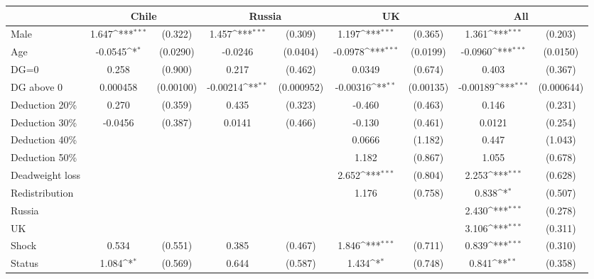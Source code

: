 {
\def\sym#1{\ifmmode^{#1}\else\(^{#1}\)\fi}
\begin{tabular}{l*{4}{cc}}
\hline\hline
                &\multicolumn{2}{c}{Chile}   &\multicolumn{2}{c}{Russia}  &\multicolumn{2}{c}{UK}      &\multicolumn{2}{c}{All}     \\
\hline
Male            &    1.647\sym{***}&  (0.322)&    1.457\sym{***}&  (0.309)&    1.197\sym{***}&  (0.365)&    1.361\sym{***}&  (0.203)\\
Age             &  -0.0545\sym{*}  & (0.0290)&  -0.0246         & (0.0404)&  -0.0978\sym{***}& (0.0199)&  -0.0960\sym{***}& (0.0150)\\
DG=0            &    0.258         &  (0.900)&    0.217         &  (0.462)&   0.0349         &  (0.674)&    0.403         &  (0.367)\\
DG above 0      & 0.000458         &(0.00100)& -0.00214\sym{**} &(0.000952)& -0.00316\sym{**} &(0.00135)& -0.00189\sym{***}&(0.000644)\\
Deduction 20\%  &    0.270         &  (0.359)&    0.435         &  (0.323)&   -0.460         &  (0.463)&    0.146         &  (0.231)\\
Deduction 30\%  &  -0.0456         &  (0.387)&   0.0141         &  (0.466)&   -0.130         &  (0.461)&   0.0121         &  (0.254)\\
Deduction 40\%  &                  &         &                  &         &   0.0666         &  (1.182)&    0.447         &  (1.043)\\
Deduction 50\%  &                  &         &                  &         &    1.182         &  (0.867)&    1.055         &  (0.678)\\
Deadweight loss &                  &         &                  &         &    2.652\sym{***}&  (0.804)&    2.253\sym{***}&  (0.628)\\
Redistribution  &                  &         &                  &         &    1.176         &  (0.758)&    0.838\sym{*}  &  (0.507)\\
Russia          &                  &         &                  &         &                  &         &    2.430\sym{***}&  (0.278)\\
UK              &                  &         &                  &         &                  &         &    3.106\sym{***}&  (0.311)\\
Shock           &    0.534         &  (0.551)&    0.385         &  (0.467)&    1.846\sym{***}&  (0.711)&    0.839\sym{***}&  (0.310)\\
Status          &    1.084\sym{*}  &  (0.569)&    0.644         &  (0.587)&    1.434\sym{*}  &  (0.748)&    0.841\sym{**} &  (0.358)\\

\end{tabular}}
